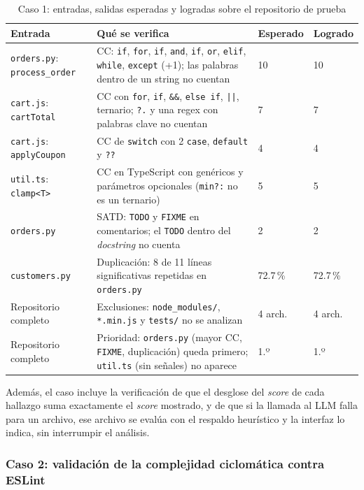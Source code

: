 \begin{table}[H]
\centering
\caption{Caso 1: entradas, salidas esperadas y logradas sobre el repositorio de prueba}
\label{tab:caso1}
\begin{tabular}{p{} p{} p{} p{}}
\toprule
\textbf{Entrada} & \textbf{Qué se verifica} & \textbf{Esperado} & \textbf{Logrado} \\
\midrule
\texttt{orders.py}: \texttt{process\_order} & CC: \texttt{if}, \texttt{for}, \texttt{if}, \texttt{and}, \texttt{if}, \texttt{or}, \texttt{elif}, \texttt{while}, \texttt{except} (+1); las palabras dentro de un string no cuentan & 10 & 10 \\[3pt]
\texttt{cart.js}: \texttt{cartTotal} & CC con \texttt{for}, \texttt{if}, \texttt{\&\&}, \texttt{else if}, \texttt{||}, ternario; \texttt{?.} y una regex con palabras clave no cuentan & 7 & 7 \\[3pt]
\texttt{cart.js}: \texttt{applyCoupon} & CC de \texttt{switch} con 2 \texttt{case}, \texttt{default} y \texttt{??} & 4 & 4 \\[3pt]
\texttt{util.ts}: \texttt{clamp<T>} & CC en TypeScript con genéricos y parámetros opcionales (\texttt{min?:} no es un ternario) & 5 & 5 \\[3pt]
\texttt{orders.py} & SATD: \texttt{TODO} y \texttt{FIXME} en comentarios; el \texttt{TODO} dentro del \textit{docstring} no cuenta & 2 & 2 \\[3pt]
\texttt{customers.py} & Duplicación: 8 de 11 líneas significativas repetidas en \texttt{orders.py} & 72.7\,\% & 72.7\,\% \\[3pt]
Repositorio completo & Exclusiones: \texttt{node\_modules/}, \texttt{*.min.js} y \texttt{tests/} no se analizan & 4 arch. & 4 arch. \\[3pt]
Repositorio completo & Prioridad: \texttt{orders.py} (mayor CC, \texttt{FIXME}, duplicación) queda primero; \texttt{util.ts} (sin señales) no aparece & 1.º & 1.º \\
\bottomrule
\end{tabular}
\end{table}

Además, el caso incluye la verificación de que el desglose del \textit{score} de cada hallazgo suma exactamente el \textit{score} mostrado, y de que si la llamada al LLM falla para un archivo, ese archivo se evalúa con el respaldo heurístico y la interfaz lo indica, sin interrumpir el análisis.

\subsubsection*{Caso 2: validación de la complejidad ciclomática contra ESLint}

